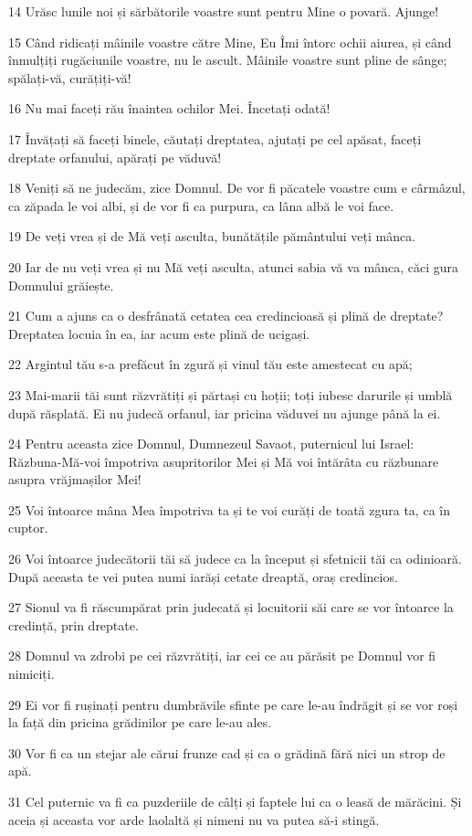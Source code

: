 \par 14 Urăsc lunile noi și sărbătorile voastre sunt pentru Mine o povară. Ajunge!
\par 15 Când ridicați mâinile voastre către Mine, Eu Îmi întorc ochii aiurea, și când înmulțiți rugăciunile voastre, nu le ascult. Mâinile voastre sunt pline de sânge; spălați-vă, curățiți-vă!
\par 16 Nu mai faceți rău înaintea ochilor Mei. Încetați odată!
\par 17 Învățați să faceți binele, căutați dreptatea, ajutați pe cel apăsat, faceți dreptate orfanului, apărați pe văduvă!
\par 18 Veniți să ne judecăm, zice Domnul. De vor fi păcatele voastre cum e cârmâzul, ca zăpada le voi albi, și de vor fi ca purpura, ca lâna albă le voi face.
\par 19 De veți vrea și de Mă veți asculta, bunătățile pământului veți mânca.
\par 20 Iar de nu veți vrea și nu Mă veți asculta, atunci sabia vă va mânca, căci gura Domnului grăiește.
\par 21 Cum a ajuns ca o desfrânată cetatea cea credincioasă și plină de dreptate? Dreptatea locuia în ea, iar acum este plină de ucigași.
\par 22 Argintul tău s-a prefăcut în zgură și vinul tău este amestecat cu apă;
\par 23 Mai-marii tăi sunt răzvrătiți și părtași cu hoții; toți iubesc darurile și umblă după răsplată. Ei nu judecă orfanul, iar pricina văduvei nu ajunge până la ei.
\par 24 Pentru aceasta zice Domnul, Dumnezeul Savaot, puternicul lui Israel: Răzbuna-Mă-voi împotriva asupritorilor Mei și Mă voi întărâta cu răzbunare asupra vrăjmașilor Mei!
\par 25 Voi întoarce mâna Mea împotriva ta și te voi curăți de toată zgura ta, ca în cuptor.
\par 26 Voi întoarce judecătorii tăi să judece ca la început și sfetnicii tăi ca odinioară. După aceasta te vei putea numi iarăși cetate dreaptă, oraș credincios.
\par 27 Sionul va fi răscumpărat prin judecată și locuitorii săi care se vor întoarce la credință, prin dreptate.
\par 28 Domnul va zdrobi pe cei răzvrătiți, iar cei ce au părăsit pe Domnul vor fi nimiciți.
\par 29 Ei vor fi rușinați pentru dumbrăvile sfinte pe care le-au îndrăgit și se vor roși la față din pricina grădinilor pe care le-au ales.
\par 30 Vor fi ca un stejar ale cărui frunze cad și ca o grădină fără nici un strop de apă.
\par 31 Cel puternic va fi ca puzderiile de câlți și faptele lui ca o leasă de mărăcini. Și aceia și aceasta vor arde laolaltă și nimeni nu va putea să-i stingă.

